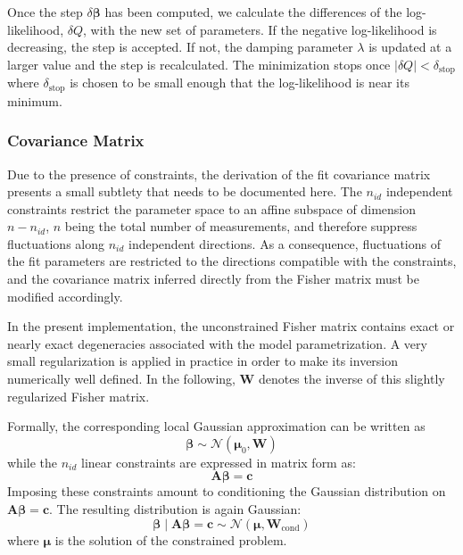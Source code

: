 Once the step  $\delta \boldsymbol{\beta}$ has been computed, we calculate the differences of the log-likelihood, $\delta Q$, with the new set of parameters. If the negative log-likelihood 
is decreasing, the step is accepted. If not, the damping parameter $\lambda$ is updated at a larger value and the step is recalculated. The minimization stops once 
$|\delta Q|<\delta_{\text{stop}}$ where $\delta_{\text{stop}}$ is chosen to be small enough that the log-likelihood is near its minimum. 


\subsubsection{Covariance Matrix}

Due to the presence of constraints, the derivation of the fit 
covariance matrix presents a small subtlety that needs to be 
documented here. The $n_{id}$ independent constraints restrict the 
parameter space to an affine subspace of dimension $n-n_{id}$, $n$ being the total number of measurements, and 
therefore suppress fluctuations along $n_{id}$ independent directions. As a 
consequence, fluctuations of the fit parameters are restricted to the 
directions compatible with the constraints, and the covariance matrix 
inferred directly from the Fisher matrix must be modified accordingly. 

In the present implementation, the unconstrained Fisher matrix 
contains exact or nearly exact degeneracies associated with the model 
parametrization. A very small regularization is applied in practice in 
order to make its inversion numerically well defined. In the 
following, $\mathbf{W}$ denotes the inverse of this slightly regularized Fisher 
matrix. 


Formally, the corresponding local Gaussian approximation can be 
written as 
\begin{equation}
    \boldsymbol{\beta} \sim \mathcal{N}(\boldsymbol{\mu}_0, \mathbf{W})
\end{equation}
while the $n_{id}$ linear 
constraints are expressed in matrix form as: 
\begin{equation}
    \mathbf{A} \boldsymbol{\beta} = \mathbf{c}
\end{equation}
Imposing these constraints amount to conditioning the Gaussian 
distribution on $\mathbf{A} \boldsymbol{\beta} =\mathbf{c}$. The resulting distribution is again 
Gaussian: 
\begin{equation}
    \boldsymbol{\beta} \mid \mathbf{A} \boldsymbol{\beta}=\mathbf{c} \sim \mathcal{N}(\boldsymbol{\mu}, \mathbf{W}_{\text{cond}})
\end{equation}
where $\boldsymbol{\mu}$ is the solution of the constrained problem. 


